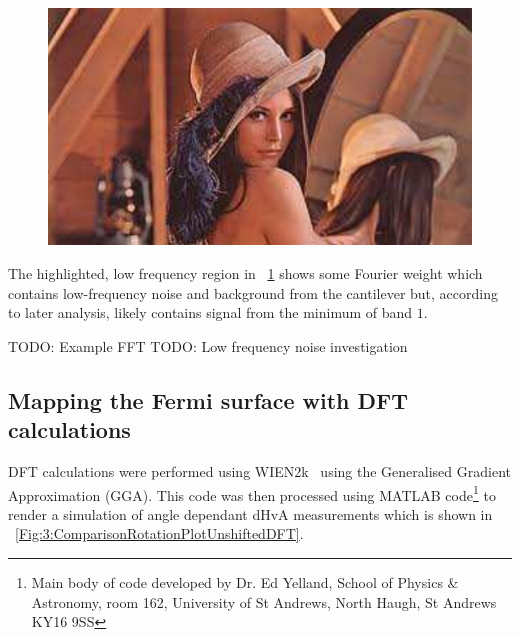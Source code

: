 \begin{figure}[h!]
    \begin{center}
        \includegraphics[scale=0.7]{Misc/TODO}
        \caption{}
        \label{Fig:3:FFTExamples}
    \end{center}
\end{figure}

The highlighted, low frequency region in \fig~\ref{Fig:3:FFTExamples} shows some Fourier weight which contains low-frequency noise and background from the cantilever but, according to later analysis, likely contains signal from the minimum of band $1$.


TODO: Example FFT
TODO: Low frequency noise investigation


\subsection{Mapping the Fermi surface with DFT calculations}
    \label{Sec:3:MappingFermiSurfaceDFTCalulations}

DFT calculations were performed using WIEN2k~\cite{Blaha2001} using the Generalised Gradient Approximation (GGA). This code was then processed using MATLAB code\footnote{Main body of code developed by Dr. Ed Yelland, School of Physics \& Astronomy, room 162, University of St Andrews, North Haugh, St Andrews KY16 9SS} to render a simulation of angle dependant dHvA measurements which is shown in \fig~\ref{Fig:3:ComparisonRotationPlotUnshiftedDFT}. 



